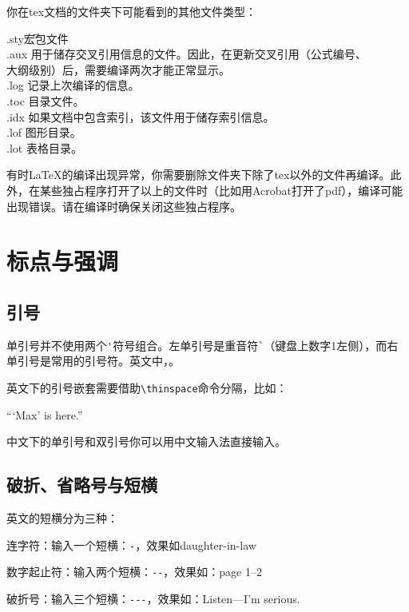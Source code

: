 {你在tex文档的文件夹下可能看到的其他文件类型：
\begin{tabbing}
	.sty{\hspace{2em}}\=宏包文件\\
	.aux    \> 用于储存交叉引用信息的文件。因此，在更新交叉引用（公式编号、\\
	\> 大纲级别）后，需要编译两次才能正常显示。\\
	.log    \> 记录上次编译的信息。\\
	.toc    \> 目录文件。\\
	.idx    \> 如果文档中包含索引，该文件用于储存索引信息。\\
	.lof    \> 图形目录。\\
	.lot    \> 表格目录。
\end{tabbing}

有时\LaTeX 的编译出现异常，你需要删除文件夹下除了tex以外的文件再编译。此外，在某些独占程序打开了以上的文件时（比如用Acrobat打开了pdf），编译可能出现错误。请在编译时确保关闭这些独占程序。

\section{标点与强调}
\subsection{引号}
单引号并不使用两个\verb|'|符号组合。左单引号是重音符\verb|`|（键盘上数字1左侧），而右单引号是常用的引号符。英文中，。

英文下的引号嵌套需要借助\verb|\thinspace|命令分隔，比如：

\begin{codeshow}
``\thinspace`Max' is here.''
\end{codeshow}

中文下的单引号和双引号你可以用中文输入法直接输入。

\subsection{破折、省略号与短横}
英文的短横分为三种：
\begin{feai}
\item 连字符：输入一个短横：\verb|-|，效果如daughter-in-law
\item 数字起止符：输入两个短横：\verb|--|，效果如：page 1--2
\item 破折号：输入三个短横：\verb|---|，效果如：Listen---I'm serious.
\end{feai}

}
